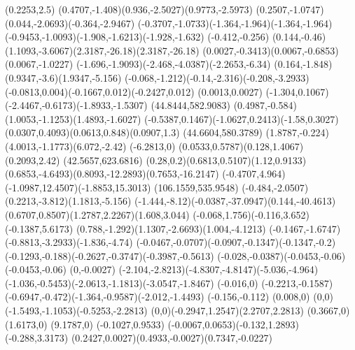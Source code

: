 {    \rlineto(0.2253,2.5)
    \rcurveto(0.4707,-1.408)(0.936,-2.5027)(0.9773,-2.5973)
    \rcurveto(0.2507,-1.0747)(0.044,-2.0693)(-0.364,-2.9467)
    \rcurveto(-0.3707,-1.0733)(-1.364,-1.964)(-1.364,-1.964)
    \rcurveto(-0.9453,-1.0093)(-1.908,-1.6213)(-1.928,-1.632)
    \rlineto(-0.412,-0.256)
    \rlineto(0.144,-0.46)
    \rcurveto(1.1093,-3.6067)(2.3187,-26.18)(2.3187,-26.18)
    \rcurveto(0.0027,-0.3413)(0.0067,-0.6853)(0.0067,-1.0227)
    \rcurveto(-1.696,-1.9093)(-2.468,-4.0387)(-2.2653,-6.34)
    \rcurveto(0.164,-1.848)(0.9347,-3.6)(1.9347,-5.156)
    \rcurveto(-0.068,-1.212)(-0.14,-2.316)(-0.208,-3.2933)
    \rcurveto(-0.0813,0.004)(-0.1667,0.012)(-0.2427,0.012)
    \rlineto(0.0013,0.0027)
    \rcurveto(-1.304,0.1067)(-2.4467,-0.6173)(-1.8933,-1.5307)
    \moveto(44.8444,582.9083)
    \rcurveto(0.4987,-0.584)(1.0053,-1.1253)(1.4893,-1.6027)
    \rcurveto(-0.5387,0.1467)(-1.0627,0.2413)(-1.58,0.3027)
    \rcurveto(0.0307,0.4093)(0.0613,0.848)(0.0907,1.3)
    \moveto(44.6604,580.3789)
    \rcurveto(1.8787,-0.224)(4.0013,-1.1773)(6.072,-2.42)
    \rlineto(-6.2813,0)
    \rcurveto(0.0533,0.5787)(0.128,1.4067)(0.2093,2.42)
    \moveto(42.5657,623.6816)
    \rcurveto(0.28,0.2)(0.6813,0.5107)(1.12,0.9133)
    \rcurveto(0.6853,-4.6493)(0.8093,-12.2893)(0.7653,-16.2147)
    \rcurveto(-0.4707,4.964)(-1.0987,12.4507)(-1.8853,15.3013)
    \closepath
    \moveto(106.1559,535.9548)
    \rcurveto(-0.484,-2.0507)(0.2213,-3.812)(1.1813,-5.156)
    \rcurveto(-1.444,-8.12)(-0.0387,-37.0947)(0.144,-40.4613)
    \rcurveto(0.6707,0.8507)(1.2787,2.2267)(1.608,3.044)
    \rcurveto(-0.068,1.756)(-0.116,3.652)(-0.1387,5.6173)
    \rcurveto(0.788,-1.292)(1.1307,-2.6693)(1.004,-4.1213)
    \rcurveto(-0.1467,-1.6747)(-0.8813,-3.2933)(-1.836,-4.74)
    \rcurveto(-0.0467,-0.0707)(-0.0907,-0.1347)(-0.1347,-0.2)
    \rcurveto(-0.1293,-0.188)(-0.2627,-0.3747)(-0.3987,-0.5613)
    \rcurveto(-0.028,-0.0387)(-0.0453,-0.06)(-0.0453,-0.06)
    \rlineto(0,-0.0027)
    \rcurveto(-2.104,-2.8213)(-4.8307,-4.8147)(-5.036,-4.964)
    \rcurveto(-1.036,-0.5453)(-2.0613,-1.1813)(-3.0547,-1.8467)
    \rlineto(-0.016,0)
    \rlineto(-0.2213,-0.1587)
    \rcurveto(-0.6947,-0.472)(-1.364,-0.9587)(-2.012,-1.4493)
    \rlineto(-0.156,-0.112)
    \rlineto(0.008,0)
    \rcurveto(0,0)(-1.5493,-1.1053)(-0.5253,-2.2813)
    \rcurveto(0,0)(-0.2947,1.2547)(2.2707,2.2813)
    \rlineto(0.3667,0)
    \rlineto(1.6173,0)
    \rlineto(9.1787,0)
    \rlineto(-0.1027,0.9533)
    \rcurveto(-0.0067,0.0653)(-0.132,1.2893)(-0.288,3.3173)
    \rcurveto(0.2427,0.0027)(0.4933,-0.0027)(0.7347,-0.0227)
}

